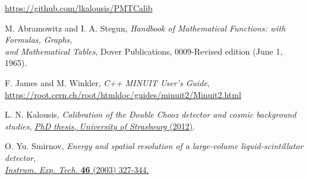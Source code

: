 \documentclass[a4paper,11pt]{article}
\begin{document}
\begin{thebibliography}{99}
 \href{https://github.com/lkalousis/PMTCalib}{https://github.com/lkalousis/PMTCalib}

 M. Abramowitz and I. A. Stegun, \emph{Handbook of Mathematical Functions: with Formulas, Graphs, \\ and Mathematical Tables}, Dover Publications, 0009-Revised edition (June 1, 1965).  

 F. James and M. Winkler, \emph{C++ MINUIT User's Guide},
\href{https://root.cern.ch/root/htmldoc/guides/minuit2/Minuit2.html}{https://root.cern.ch/root/htmldoc/guides/minuit2/Minuit2.html}

 L. N. Kalousis, \emph{Calibration of the Double Chooz detector and cosmic background studies}, \href{http://inspirehep.net/record/1295030}{\emph{PhD thesis, University of Strasbourg} (2012)}. 

 O. Yu. Smirnov, \emph{Energy and spatial resolution of a large-volume liquid-scintillator detector}, \\
\href{https://link.springer.com/article/10.1023/A:1024458203966}{\emph{Instrum. Exp. Tech.} {\bf 46} (2003) 327-344.}


\end{thebibliography}
\end{document}
